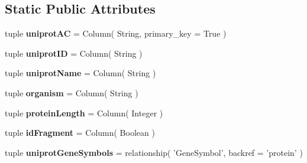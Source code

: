\subsection*{Static Public Attributes}
\begin{DoxyCompactItemize}
\item 
\hypertarget{classsrc_1_1fr_1_1tagc_1_1rainet_1_1core_1_1data_1_1Protein_1_1Protein_a2798db19d4f935c15a4effa12decd9ef}{tuple {\bfseries uniprot\-A\-C} = Column( String, primary\-\_\-key = True )}\label{classsrc_1_1fr_1_1tagc_1_1rainet_1_1core_1_1data_1_1Protein_1_1Protein_a2798db19d4f935c15a4effa12decd9ef}

\item 
\hypertarget{classsrc_1_1fr_1_1tagc_1_1rainet_1_1core_1_1data_1_1Protein_1_1Protein_a6857fd877f8bc86e5785a7a401938377}{tuple {\bfseries uniprot\-I\-D} = Column( String )}\label{classsrc_1_1fr_1_1tagc_1_1rainet_1_1core_1_1data_1_1Protein_1_1Protein_a6857fd877f8bc86e5785a7a401938377}

\item 
\hypertarget{classsrc_1_1fr_1_1tagc_1_1rainet_1_1core_1_1data_1_1Protein_1_1Protein_a61c9e7352642849c9a3af1b462758bea}{tuple {\bfseries uniprot\-Name} = Column( String )}\label{classsrc_1_1fr_1_1tagc_1_1rainet_1_1core_1_1data_1_1Protein_1_1Protein_a61c9e7352642849c9a3af1b462758bea}

\item 
\hypertarget{classsrc_1_1fr_1_1tagc_1_1rainet_1_1core_1_1data_1_1Protein_1_1Protein_a1fc531019a865d0542a703f7451f7ce9}{tuple {\bfseries organism} = Column( String )}\label{classsrc_1_1fr_1_1tagc_1_1rainet_1_1core_1_1data_1_1Protein_1_1Protein_a1fc531019a865d0542a703f7451f7ce9}

\item 
\hypertarget{classsrc_1_1fr_1_1tagc_1_1rainet_1_1core_1_1data_1_1Protein_1_1Protein_afb1a9297547302bb073f3d13c41dd335}{tuple {\bfseries protein\-Length} = Column( Integer )}\label{classsrc_1_1fr_1_1tagc_1_1rainet_1_1core_1_1data_1_1Protein_1_1Protein_afb1a9297547302bb073f3d13c41dd335}

\item 
\hypertarget{classsrc_1_1fr_1_1tagc_1_1rainet_1_1core_1_1data_1_1Protein_1_1Protein_ae59a8d90168f71b0b3cc00132bca8fe2}{tuple {\bfseries id\-Fragment} = Column( Boolean )}\label{classsrc_1_1fr_1_1tagc_1_1rainet_1_1core_1_1data_1_1Protein_1_1Protein_ae59a8d90168f71b0b3cc00132bca8fe2}

\item 
\hypertarget{classsrc_1_1fr_1_1tagc_1_1rainet_1_1core_1_1data_1_1Protein_1_1Protein_a52584ceabe68dba4a0716ae256fb1f65}{tuple {\bfseries uniprot\-Gene\-Symbols} = relationship( 'Gene\-Symbol', backref = 'protein' )}\label{classsrc_1_1fr_1_1tagc_1_1rainet_1_1core_1_1data_1_1Protein_1_1Protein_a52584ceabe68dba4a0716ae256fb1f65}


\end{DoxyCompactItemize}
